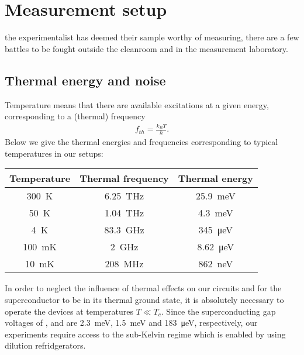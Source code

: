 \section{Measurement setup}

 the experimentalist has deemed their sample worthy of measuring, there are a few battles to be fought outside the cleanroom and in the measurement laboratory.

\subsection{Thermal energy and noise}

Temperature means that there are available excitations at a given energy, corresponding to a (thermal) frequency
\begin{align}
f_{th}=\frac{k_B T}{h}.
\end{align}
Below we give the thermal energies and frequencies corresponding to typical temperatures in our setups:
\begin{center}
\begin{tabular}{ccc}
	\hline \hline
	Temperature & Thermal frequency & Thermal energy \\ 
	\hline 
	\SI{300}{\kelvin} & \SI{6.25}{\tera\hertz} & \SI{25.9}{\milli\electronvolt} \\ 
	\SI{50}{\kelvin} & \SI{1.04}{\tera\hertz} & \SI{4.3}{\milli\electronvolt} \\ 
	\SI{4}{\kelvin} & \SI{83.3}{\giga\hertz} & \SI{345}{\micro\electronvolt} \\ 
	\SI{100}{\milli\kelvin} & \SI{2}{\giga\hertz} & \SI{8.62}{\micro\electronvolt} \\ 
	\SI{10}{\milli\kelvin} & \SI{208}{\mega\hertz} & \SI{862}{\nano\electronvolt} \\ 
	\hline \hline
\end{tabular}
\end{center}

In order to neglect the influence of thermal effects on our circuits and for the superconductor to be in its thermal ground state, it is absolutely necessary to operate the devices at temperatures $T \ll T_c$.
Since the superconducting gap voltages of ,  and  are \SI{2.3}{\milli\electronvolt}, \SI{1.5}{\milli\electronvolt} and \SI{183}{\micro\electronvolt}, respectively, our experiments require access to the sub-Kelvin regime which is enabled by using dilution refridgerators.

